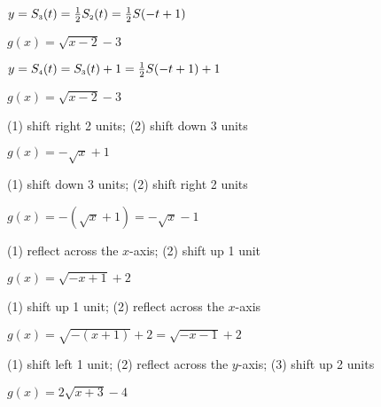 \documentclass{ximera}
\begin{document}
\begin{question}
$y = S_{\text{\tiny $3$}}(t) = \frac{1}{2}  S_{\text{\tiny $2$}}(t) =  \frac{1}{2}S(-t+1)$
\begin{solution}
$g(x) = \sqrt{x-2} - 3$
\end{solution}

\end{question}

\begin{question}
$y = S_{\text{\tiny $4$}}(t) = S_{\text{\tiny $3$}}(t) + 1 = \frac{1}{2}S(-t+1) + 1$ 

\begin{solution}
$g(x) = \sqrt{x-2} - 3$

\end{solution}

\end{question}

\begin{question}
(1) shift right 2 units; (2) shift down 3 units
\begin{solution}
$g(x) = -\sqrt{x} + 1$
\end{solution}

\end{question}

\begin{question}
(1) shift down 3 units; (2) shift right 2 units
\begin{solution}
$g(x) = -(\sqrt{x} + 1) = -\sqrt{x} - 1$

\end{solution}

\end{question}

\begin{question}
(1) reflect across the $x$-axis; (2) shift up 1 unit
\begin{solution}
$g(x) = \sqrt{-x+1} + 2$
\end{solution}

\end{question}

\begin{question}
(1) shift up 1 unit; (2) reflect across the $x$-axis
\begin{solution}
$g(x) = \sqrt{-(x+1)} + 2 = \sqrt{-x-1} + 2$

\end{solution}

\end{question}

\begin{question}
(1) shift left 1 unit; (2) reflect across the $y$-axis; (3) shift up 2 units
\begin{solution}
$g(x) = 2\sqrt{x+3} - 4$
\end{solution}

\end{question}
\end{document}
